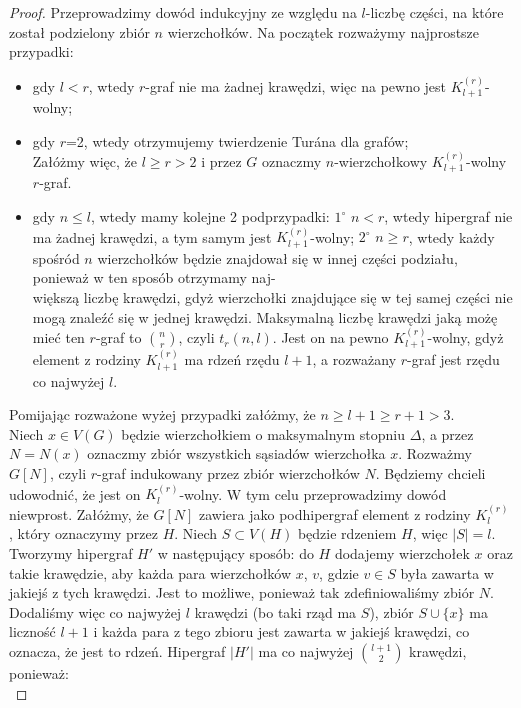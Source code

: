 \documentclass[miz,woman]{mgrwms}
\begin{document}
\begin{proof}
 Przeprowadzimy dowód indukcyjny ze względu na $l$-liczbę części, na które został podzielony zbiór $n$ wierzchołków. Na początek
rozważymy najprostsze przypadki:
\begin{itemize}
 \item gdy $l<r$, wtedy $r$-graf nie ma żadnej krawędzi, więc na pewno jest $K_{l+1}^{(r)}$-wolny;
 \item gdy $r$=2, wtedy otrzymujemy twierdzenie Tur\'ana dla grafów;\\
Załóżmy więc, że $l\geq r>2$ i przez $G$ oznaczmy  $n$-wierzchołkowy $K_{l+1}^{(r)}$-wolny $r$-graf.
 \item gdy $n \leq l$, wtedy mamy kolejne 2 podprzypadki: $1^{\circ}$ $n<r$, wtedy hipergraf nie ma żadnej krawędzi, a tym
samym jest $K_{l+1}^{(r)}$-wolny; $2^{\circ}$ $n \geq r$, wtedy każdy spośród $n$ wierzchołków będzie znajdował się w innej
części podziału, ponieważ w ten sposób otrzymamy naj-\\ większą liczbę krawędzi, gdyż wierzchołki znajdujące się w tej samej części nie mogą
znaleźć się w jednej krawędzi. Maksymalną liczbę krawędzi jaką możę mieć ten $r$-graf to $n \choose r$, czyli $t_r(n,l)$. 
Jest on na pewno $K_{l+1}^{(r)}$-wolny, gdyż element z rodziny $K_{l+1}^{(r)}$ ma rdzeń rzędu $l+1$, a rozważany 
$r$-graf jest rzędu co najwyżej $l$.
\end{itemize}
Pomijając rozważone wyżej przypadki załóżmy, że $n\geq l+1\geq r+1>3$.\\
Niech $x \in V(G)$ będzie wierzchołkiem o maksymalnym stopniu $\Delta$, a przez $N=N(x)$ oznaczmy zbiór wszystkich sąsiadów 
wierzchołka $x$. Rozważmy $G[N]$, czyli $r$-graf indukowany przez zbiór wierzchołków $N$. Będziemy chcieli udowodnić, że
jest on $K_l^{(r)}$-wolny. W tym celu przeprowadzimy dowód niewprost. Załóżmy, że $G[N]$ zawiera jako podhipergraf element
z rodziny $K_l^{(r)}$, który oznaczymy przez $H$. Niech $S\subset V(H)$ będzie rdzeniem $H$, więc $|S|=l$. Tworzymy hipergraf $H'$ w
następujący sposób: do $H$ dodajemy wierzchołek $x$ oraz takie krawędzie, aby każda para wierzchołków $x$, $v$, gdzie $v\in S$
była zawarta w jakiejś z tych krawędzi. Jest to możliwe, ponieważ tak zdefiniowaliśmy zbiór $N$. Dodaliśmy więc co najwyżej $l$
krawędzi (bo taki rząd ma $S$), zbiór $S\cup \{x\}$ ma liczność $l+1$ i każda para z tego zbioru jest zawarta w jakiejś krawędzi, 
co oznacza, że jest to rdzeń. Hipergraf $|H'|$ ma co najwyżej ${{l+1} \choose 2}$ krawędzi, ponieważ:
\begin{equation}

\end{equation}
\end{proof}
\end{document}
